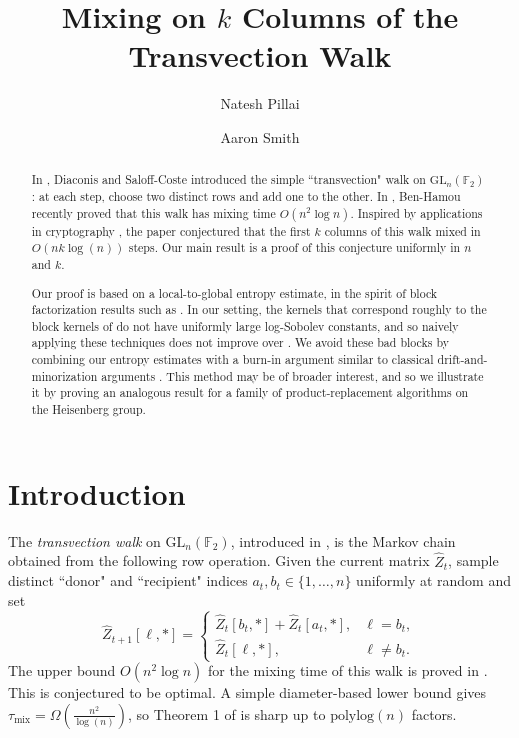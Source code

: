 \documentclass[11pt, reqno]{amsart}
\title[$k$-Column Transvections via Local Entropy]
{Mixing on $k$ Columns of the Transvection Walk}
\author{Natesh Pillai}
\author{Aaron Smith}
\date{}
\numberwithin{equation}{section}
\newcommand{\Ft}{\mathbb F_2}
\newcommand{\GLn}{\mathrm{GL}_n(\Ft)}
\begin{document}
\maketitle

\begin{abstract}
In \cite{Diaconis1996WalksOG}, Diaconis and Saloff-Coste introduced the simple ``transvection" walk on $\mathrm{GL}_n(\mathbb F_2)$: at each
step, choose two distinct rows and add one to the other. In \cite{BenHamou2025}, Ben-Hamou recently proved that this walk has mixing time $O(n^2\log n)$. Inspired by applications in cryptography \cite{sotirakitrap}, the paper \cite{BenHamouPeres2018} conjectured that the first $k$ columns of this walk mixed in $O(nk \log(n))$ steps. Our main result is a proof of this conjecture uniformly in $n$ and $k.$


Our proof is based on a local-to-global entropy estimate, in the spirit of block factorization results such as
\cite{CaputoMenzTetali2015ApproxTensor,CaputoParisi2021BlockFactorization}. In our setting, the kernels that correspond roughly to the block kernels of \cite{CaputoParisi2021BlockFactorization} do not have uniformly large log-Sobolev constants, and so naively applying these techniques does not improve over \cite{BenHamou2025}. We avoid these bad blocks by combining our entropy estimates with a burn-in argument similar to classical drift-and-minorization arguments \cite{Rosenthal1995Minorization}. This method may be of broader interest, and so we illustrate it by proving an analogous result for a family of product-replacement algorithms on the Heisenberg group. 
\end{abstract}



\section{Introduction}\label{sec:introduction}

The \emph{transvection walk} on \(\GLn\), introduced in
\cite{Diaconis1996WalksOG}, is the Markov chain obtained from the following row
operation.  Given the current matrix \(\widehat Z_t\), sample distinct ``donor" and ``recipient" indices
\(a_t,b_t\in\{1,\ldots,n\}\) uniformly at random and set
\[
\widehat Z_{t+1}[\ell,*]
=
\begin{cases}
\widehat Z_t[b_t,*]+\widehat Z_t[a_t,*], & \ell=b_t,\\[4pt]
\widehat Z_t[\ell,*], & \ell\ne b_t.
\end{cases}
\]
 The upper bound
\(O(n^2\log n)\) for the mixing time of this walk is proved in \cite[Theorem~1]{BenHamou2025}. This is conjectured to be optimal. A simple diameter-based lower bound gives $\tau_{\mathrm{mix}} = \Omega \left( \frac{n^{2}}{\log(n)}\right)$, so Theorem 1 of \cite{BenHamou2025} is sharp up to $\text{polylog}(n)$ factors.
\end{document}
